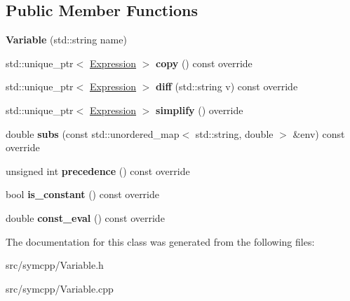 \subsection*{Public Member Functions}
\begin{DoxyCompactItemize}
\item 
{\bfseries Variable} (std\+::string name)\hypertarget{classVariable_aa577850f5c43638f1042bb4fc1356c25}{}\label{classVariable_aa577850f5c43638f1042bb4fc1356c25}

\item 
std\+::unique\+\_\+ptr$<$ \hyperlink{classExpression}{Expression} $>$ {\bfseries copy} () const override\hypertarget{classVariable_a55ddb36d00d75c3c9d260209aeefef4a}{}\label{classVariable_a55ddb36d00d75c3c9d260209aeefef4a}

\item 
std\+::unique\+\_\+ptr$<$ \hyperlink{classExpression}{Expression} $>$ {\bfseries diff} (std\+::string v) const override\hypertarget{classVariable_a15f232f8e34914a3ca99721eb2c3e54c}{}\label{classVariable_a15f232f8e34914a3ca99721eb2c3e54c}

\item 
std\+::unique\+\_\+ptr$<$ \hyperlink{classExpression}{Expression} $>$ {\bfseries simplify} () override\hypertarget{classVariable_ae60be91921542c1e771dcf411bb2657d}{}\label{classVariable_ae60be91921542c1e771dcf411bb2657d}

\item 
double {\bfseries subs} (const std\+::unordered\+\_\+map$<$ std\+::string, double $>$ \&env) const override\hypertarget{classVariable_aa31e75d7ede4cf20a48274d72489a048}{}\label{classVariable_aa31e75d7ede4cf20a48274d72489a048}

\item 
unsigned int {\bfseries precedence} () const override\hypertarget{classVariable_a6f1627d843f6376e29cf6b69bd67ede9}{}\label{classVariable_a6f1627d843f6376e29cf6b69bd67ede9}

\item 
bool {\bfseries is\+\_\+constant} () const override\hypertarget{classVariable_a160e7890ce510ab9d37c74ccbd0d56db}{}\label{classVariable_a160e7890ce510ab9d37c74ccbd0d56db}

\item 
double {\bfseries const\+\_\+eval} () const override\hypertarget{classVariable_a600a12f30dce7f130828c1e58af44c04}{}\label{classVariable_a600a12f30dce7f130828c1e58af44c04}

\end{DoxyCompactItemize}


The documentation for this class was generated from the following files\+:\begin{DoxyCompactItemize}
\item 
src/symcpp/Variable.\+h\item 
src/symcpp/Variable.\+cpp\end{DoxyCompactItemize}
